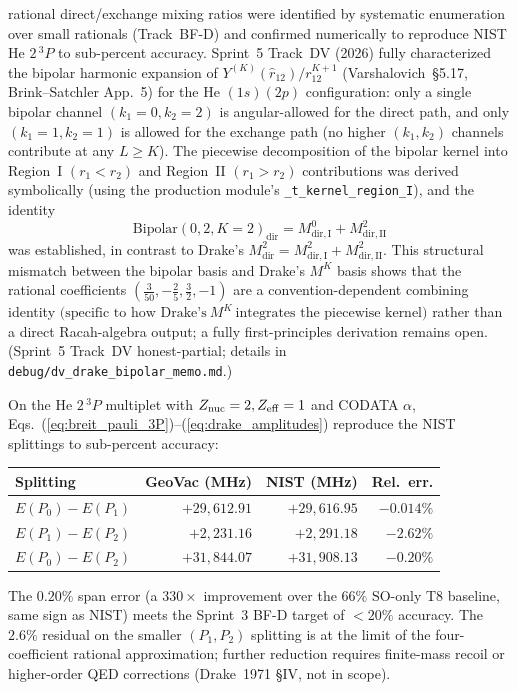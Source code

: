 \documentclass[aps,pra,twocolumn,superscriptaddress,longbibliography]{revtex4-2}
\begin{document}
rational direct/exchange mixing ratios were identified by
systematic enumeration over small rationals (Track~BF-D) and
confirmed numerically to reproduce NIST He $2\,^3\!P$ to sub-percent
accuracy.
Sprint~5 Track~DV (2026) fully characterized the bipolar harmonic
expansion of
$Y^{(K)}(\hat r_{12})/r_{12}^{K+1}$
(Varshalovich~\S5.17, Brink--Satchler App.~5) for the He
$(1s)(2p)$ configuration: only a single bipolar channel
$(k_1\!=\!0, k_2\!=\!2)$ is angular-allowed for the direct path,
and only $(k_1\!=\!1, k_2\!=\!1)$ is allowed for the exchange path
(no higher $(k_1, k_2)$ channels contribute at any $L\geq K$).  The
piecewise decomposition of the bipolar kernel into Region~I
$(r_1<r_2)$ and Region~II $(r_1>r_2)$ contributions was derived
symbolically (using the production module's
\texttt{\_t\_kernel\_region\_I}), and the identity
\[
  \text{Bipolar}(0, 2, K{=}2)_{\mathrm{dir}} = M^0_{\mathrm{dir},\mathrm{I}} + M^2_{\mathrm{dir},\mathrm{II}}
\]
was established, in contrast to Drake's
$M^2_{\mathrm{dir}} = M^2_{\mathrm{dir},\mathrm{I}} + M^2_{\mathrm{dir},\mathrm{II}}$.
This structural mismatch between the bipolar basis and Drake's
$M^K$ basis shows that the rational coefficients
$(\tfrac{3}{50}, -\tfrac{2}{5}, \tfrac{3}{2}, -1)$ are a
convention-dependent combining identity
$\bigl(\text{specific to how Drake's}\ M^K\ \text{integrates the piecewise kernel}\bigr)$
rather than a direct Racah-algebra output; a fully first-principles
derivation remains open.  (Sprint~5 Track~DV honest-partial; details
in \texttt{debug/dv\_drake\_bipolar\_memo.md}.)

On the He $2\,^3\!P$ multiplet with $Z_{\rm nuc} = 2, Z_{\rm eff} = 1$
and CODATA $\alpha$, Eqs.~(\ref{eq:breit_pauli_3P})--(\ref{eq:drake_amplitudes})
reproduce the NIST splittings to sub-percent accuracy:
\begin{center}
  \begin{tabular}{lrrr}
    \toprule
    Splitting & GeoVac (MHz) & NIST (MHz) & Rel.\ err.\\
    \midrule
    $E(P_0) - E(P_1)$ & $+29{,}612.91$ & $+29{,}616.95$ & $-0.014\%$\\
    $E(P_1) - E(P_2)$ & $ +2{,}231.16$ & $ +2{,}291.18$ & $-2.62\%$\\
    $E(P_0) - E(P_2)$ & $+31{,}844.07$ & $+31{,}908.13$ & $-0.20\%$\\
    \bottomrule
  \end{tabular}
\end{center}
The $0.20\%$ span error (a $330\times$ improvement over the
$66\%$ SO-only T8 baseline, same sign as NIST) meets the Sprint~3
BF-D target of $<20\%$ accuracy.  The $2.6\%$ residual on the
smaller $(P_1, P_2)$ splitting is at the limit of the
four-coefficient rational approximation; further reduction requires
finite-mass recoil or higher-order QED corrections (Drake~1971
\S IV, not in scope).
\end{document}
